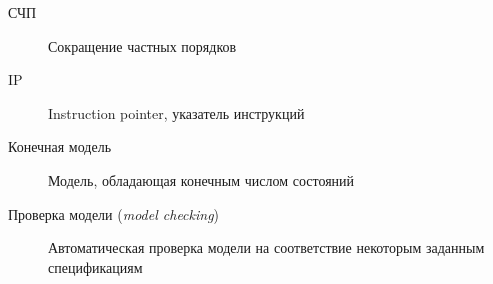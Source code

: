 
\Abbreviations
\begin{description}
\item[СЧП] Сокращение частных порядков
\item[IP] Instruction pointer, указатель инструкций
\end{description}

\Defines
\begin{description}
\item[Конечная модель] Модель, обладающая конечным числом состояний
\item[Проверка модели (\textit{model checking})] Автоматическая проверка модели на
  соответствие некоторым заданным спецификациям
\end{description}

